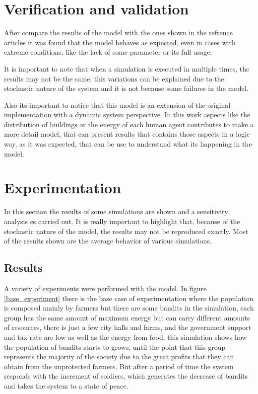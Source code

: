 \documentclass{wscpaperproc}
\begin{document}
\section{Verification and validation}

After compare the results of the model with the ones shown in the refrence
articles it was found that the model behaves as expected, even in cases with
extreme conditions, like the lack of some parameter or its full usage.

It is important to note that when a simulation is executed in multiple
times, the results may not be the same, this variations can be explained due
to the stochastic nature of the system and it is not because some failures in
the model.

Also its important to notice that this model is an extension of the original
implementation with a dynamic system perspective. In this work aspects like
the distribution of buildings or the energy of each human agent contributes
to make a more detail model, that can present results that contains those
aspects in a logic way, as it was expected, that can be use to understand what
its happening in the model.

\section{Experimentation}

In this section the results of some simulations are shown and a sensitivity
analysis es carried out. It is really important to highlight that, because
of the stochastic nature of the model, the results may not be reproduced
exactly. Most of the results shown are the average behavior of various
simulations.

\subsection{Results}

A variety of experiments were performed with the model. In figure
\ref{base_experiment} there is the base case of experimentation where the
population is composed mainly by farmers but there are some bandits in the
simulation, each group has the same amount of maximum energy but can carry
different amounts of resources, there is just a few city halls and farms, and
the government support and tax rate are low as well as the energy from food.
this simulation shows how the population of bandits starts to grows, until the
point that this group represents the majority of the society due to the great
profits that they can obtain from the unprotected farmers. But after a period
of time the system responds with the increment of soldiers, which generates the
decrease of bandits and takes the system to a state of peace.
\end{document}
